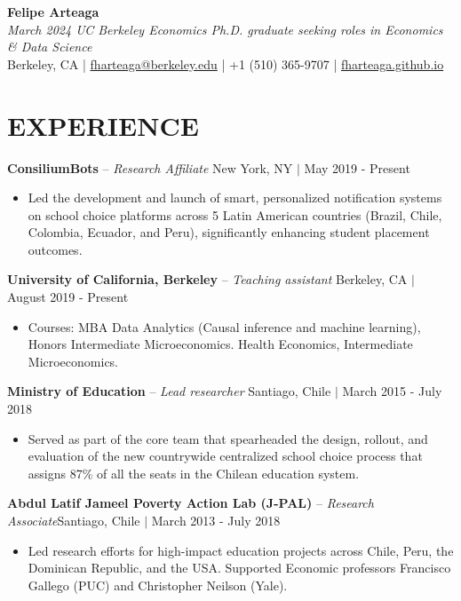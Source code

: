 \documentclass[letter,9pt]{extarticle}
\begin{document}
\pagestyle{empty}



\begin{center}
{\Large \textbf{Felipe Arteaga}}\\[2pt] %
\textit{March 2024 UC Berkeley Economics Ph.D. graduate seeking roles in Economics \& Data Science}\\[3pt]
Berkeley, CA | \href{mailto:fharteaga@berkeley.edu}{fharteaga@berkeley.edu} | +1 (510) 365-9707 | \href{https://fharteaga.github.io/}{fharteaga.github.io} 
\end{center}

\section*{EXPERIENCE}
\noindent
\textbf{ConsiliumBots} -- \textit{Research Affiliate}  \hfill New York, NY $|$ May 2019 - Present %
\begin{itemize}
    \item Led the development and launch of smart, personalized notification systems on school choice platforms across 5 Latin American countries (Brazil, Chile, Colombia, Ecuador, and Peru), significantly enhancing student placement outcomes.  %
\end{itemize}
\noindent
\textbf{University of California, Berkeley} -- \textit{Teaching assistant} \hfill Berkeley, CA $|$ August 2019 - Present
\begin{itemize}
    \item Courses: MBA Data Analytics (Causal inference and machine learning), Honors Intermediate Microeconomics.
Health Economics, Intermediate Microeconomics.  %
\end{itemize}
\noindent
\textbf{Ministry of Education} -- \textit{Lead researcher}  \hfill Santiago, Chile $|$ March 2015 - July 2018 %
\begin{itemize}
    \item Served as part of the core team that spearheaded the design, rollout, and evaluation of the new countrywide centralized school choice process that assigns 87\% of all the seats in the Chilean education system. %
\end{itemize}
\noindent
\textbf{Abdul Latif Jameel Poverty Action Lab (J-PAL)} -- \textit{Research Associate}\hfill Santiago, Chile $|$ March 2013 - July 2018 %
\begin{itemize}
    \item Led research efforts for high-impact education projects across Chile, Peru, the Dominican Republic, and the USA. Supported Economic professors Francisco Gallego (PUC) and Christopher Neilson (Yale).
\end{itemize}
\end{document}

